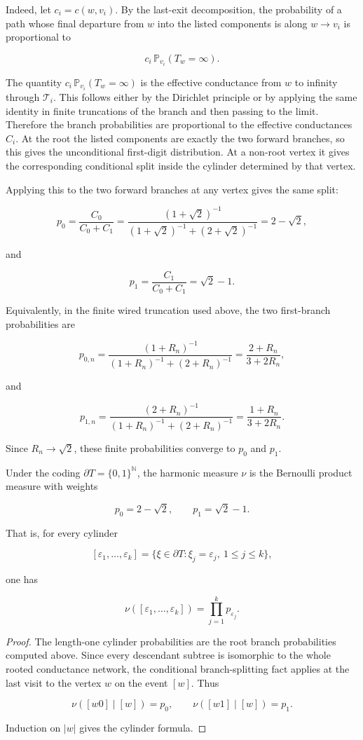 \documentclass[11pt,a4paper]{scrartcl}
\begin{document}
Indeed, let \(c_i=c(w,v_i)\). By the last-exit decomposition, the probability
of a path whose final departure from \(w\) into the listed components is along
\(w\to v_i\) is proportional to

\[
c_i\,\mathbb P_{v_i}(T_w=\infty).
\]

The quantity \(c_i\,\mathbb P_{v_i}(T_w=\infty)\) is the effective conductance
from \(w\) to infinity through \(\mathcal T_i\). This follows either by the
Dirichlet principle or by applying the same identity in finite truncations of
the branch and then passing to the limit. Therefore the branch probabilities
are proportional to the effective conductances \(C_i\). At the root the listed
components are exactly the two forward branches, so this gives the unconditional
first-digit distribution. At a non-root vertex it gives the corresponding
conditional split inside the cylinder determined by that vertex.

Applying this to the two forward branches at any vertex gives the same split:

\[
p_0=\frac{C_0}{C_0+C_1}
=
\frac{(1+\sqrt2)^{-1}}
{(1+\sqrt2)^{-1}+(2+\sqrt2)^{-1}}
=
2-\sqrt2,
\]

and

\[
p_1=\frac{C_1}{C_0+C_1}
=
\sqrt2-1.
\]

Equivalently, in the finite wired truncation used above, the two first-branch
probabilities are

\[
p_{0,n}
=
\frac{(1+R_n)^{-1}}{(1+R_n)^{-1}+(2+R_n)^{-1}}
=
\frac{2+R_n}{3+2R_n},
\]

and

\[
p_{1,n}
=
\frac{(2+R_n)^{-1}}{(1+R_n)^{-1}+(2+R_n)^{-1}}
=
\frac{1+R_n}{3+2R_n}.
\]

Since \(R_n\to\sqrt2\), these finite probabilities converge to \(p_0\) and
\(p_1\).

\begin{proposition}\label{prop:harmonic-measure-product}
Under the coding \(\partial T=\{0,1\}^{\mathbb N}\), the
harmonic measure \(\nu\) is the Bernoulli product measure with weights

\[
p_0=2-\sqrt2,
\qquad
p_1=\sqrt2-1.
\]

That is, for every cylinder

\[
[\varepsilon_1,\ldots,\varepsilon_k]
=
\{\xi\in\partial T:\xi_j=\varepsilon_j,\ 1\le j\le k\},
\]

one has

\[
\nu([\varepsilon_1,\ldots,\varepsilon_k])
=
\prod_{j=1}^k p_{\varepsilon_j}.
\]

\end{proposition}
\begin{proof}
The length-one cylinder probabilities are the root branch probabilities
computed above. Since every descendant subtree is isomorphic to the whole
rooted conductance network, the conditional branch-splitting fact applies at
the last visit to the vertex \(w\) on the event \([w]\). Thus

\[
\nu([w0]\mid [w])=p_0,
\qquad
\nu([w1]\mid [w])=p_1.
\]

Induction on \(|w|\) gives the cylinder formula.
\end{proof}
\end{document}
